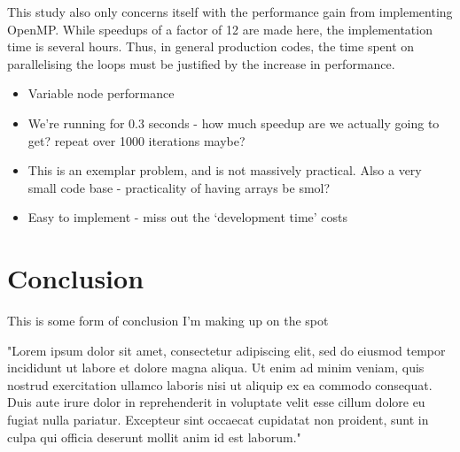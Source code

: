 \documentclass{article} %
\begin{document}
This study also only concerns itself with the performance gain from implementing OpenMP.
While speedups of a factor of 12 are made here, the implementation time is several hours.
Thus, in general production codes, the time spent on parallelising the loops must be justified by the increase in performance.

\begin{itemize}
    \item Variable node performance
    \item We're running for 0.3 seconds - how much speedup are we actually going to get? repeat over 1000 iterations maybe?
    \item This is an exemplar problem, and is not massively practical. Also a very small code base - practicality of having arrays be smol?
    \item Easy to implement - miss out the `development time' costs 
\end{itemize}

\section*{Conclusion}

This is some form of conclusion I'm making up on the spot

"Lorem ipsum dolor sit amet, consectetur adipiscing elit, sed do eiusmod tempor incididunt ut labore et dolore magna aliqua. Ut enim ad minim veniam, quis nostrud exercitation ullamco laboris nisi ut aliquip ex ea commodo consequat. Duis aute irure dolor in reprehenderit in voluptate velit esse cillum dolore eu fugiat nulla pariatur. Excepteur sint occaecat cupidatat non proident, sunt in culpa qui officia deserunt mollit anim id est laborum."



\newpage

\end{document}
